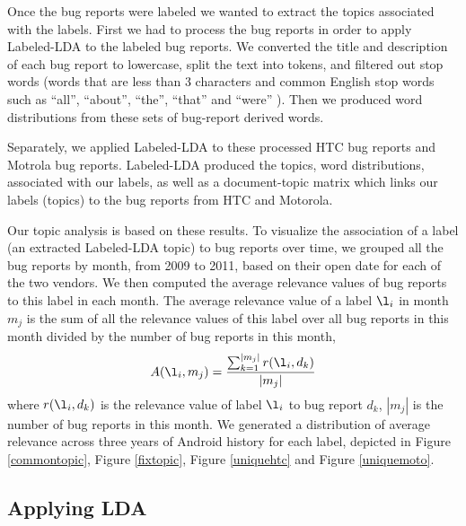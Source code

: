 \documentclass[10pt, conference, compsocconf]{IEEEtran}
\begin{document}
Once the bug reports were labeled we wanted to extract the topics
associated with the labels. First we had to process the bug reports 
in order to apply Labeled-LDA to the labeled bug reports. 
We converted the title and description of each bug report to lowercase,
split the text into tokens, and filtered out stop words (words that are less than 3 characters and
common English stop words such as ``all'', ``about'', ``the'',
``that'' and ``were'' ). Then we produced word distributions from
these sets of bug-report derived words.

Separately, we applied Labeled-LDA to these processed HTC bug reports and Motrola bug reports.
Labeled-LDA produced the topics, word distributions, associated
with our labels, as well as a document-topic matrix which links our
labels (topics) to the bug reports from HTC and Motorola.

Our topic analysis is based on these results. 
To visualize the association of a label (an extracted
Labeled-LDA topic) to bug reports over time,
we grouped
all the bug reports by month, from 2009 to 2011, based on their open
date for each of the two vendors. 
We then computed the average relevance values of bug
reports to this label in each month. 
The average relevance value of a label \begin{math} \l_i \end{math} in
month \begin{math} m_j \end{math} is the sum of all the relevance
values of this label over all bug reports in this month divided by the
number of bug reports in this month,
\begin{equation}
A(\l_i,m_j) = \frac{\sum_{\substack{k=1}}^{|m_j|}r(\l_i,d_k)}{|m_j|}
\label{equation1}
\end{equation}
where $r(\l_i,d_k)$ is the relevance value of label $\l_i$ to bug
report $d_k$, $|m_j|$ is the number of bug reports in this month. 
We generated a distribution of average relevance across three years of
Android history for 
each label, depicted in Figure \ref{commontopic}, Figure \ref{fixtopic},
Figure \ref{uniquehtc} and Figure \ref{uniquemoto}.


\subsection{Applying LDA}

\end{document}
